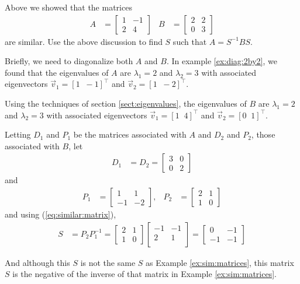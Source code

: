 \begin{example}
Above we showed that the matrices 
\begin{align*}
A & = \begin{bmatrix}
1 & -1 \\ 2 & 4
\end{bmatrix} & B & = \begin{bmatrix}
2 & 2 \\ 0 & 3
\end{bmatrix} 
\end{align*}
 are similar.  Use the above discussion to find $S$ such that $A=S^{-1}BS$. 
 
\solution 

Briefly, we need to diagonalize both $A$ and $B$. In example \ref{ex:diag:2by2}, we found that the eigenvalues of $A$ are $\lambda_1=2$ and $\lambda_2=3$ with associated eigenvectors $\vec{v}_1=[1\;\;-1]^{\intercal}$ and $\vec{v}_2=[1\;\;-2]^{\intercal}$.

Using the techniques of section \ref{sect:eigenvalues}, the eigenvalues of $B$ are $\lambda_1=2$ and $\lambda_2=3$ with associated eigenvectors $\vec{v}_1=[1\;\;4]^{\intercal}$ and $\vec{v}_2=[0\;\;1]^{\intercal}$. 
 
Letting $D_1$ and $P_1$ be the matrices associated with $A$ and $D_2$ and $P_2$, those associated with $B$, let
%
\begin{align*}
D_1 & = D_2 = \begin{bmatrix}
3 & 0 \\ 0 & 2
\end{bmatrix}
\end{align*}
and
%
\begin{align*}
P_1 & = \begin{bmatrix}
1 & 1 \\
-1 & -2 
\end{bmatrix}, & P_2 & = \begin{bmatrix}
2 & 1 \\
1 & 0
\end{bmatrix}
\end{align*}
and using (\ref{eq:similar:matrix}), 
%
\begin{align*}
S & = P_{2} P_1^{-1} = \begin{bmatrix}
2 & 1 \\ 1 & 0 
\end{bmatrix} \begin{bmatrix}
-1 & -1\\ 
2 & 1\\
\end{bmatrix}= \begin{bmatrix}
0 &  -1 \\
-1 & -1 
\end{bmatrix}
\end{align*}
 
And although this $S$ is not the same $S$ as Example \ref{ex:sim:matrices}, this matrix $S$ is the negative of the inverse of that matrix in Example \ref{ex:sim:matrices}.  
\end{example}


